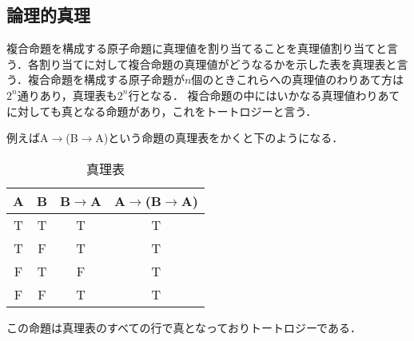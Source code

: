 \documentclass[10pt,b5paper,papersize,dvipdfmx]{jsbook}
\begin{document}
\subsection{論理的真理}
複合命題を構成する原子命題に真理値を割り当てることを真理値割り当てと言う．各割り当てに対して複合命題の真理値がどうなるかを示した表を真理表と言う．複合命題を構成する原子命題が$n$個のときこれらへの真理値のわりあて方は$2^n$通りあり，真理表も$2^n$行となる．
複合命題の中にはいかなる真理値わりあてに対しても真となる命題があり，これをトートロジーと言う．\par
例えばA$\to$(B$\to$A)という命題の真理表をかくと下のようになる．
\begin{table}[H]
\begin{center}
\caption{真理表}
\begin{tabular}{|c|c||c|c|}\hline
A&B&B$\to$A&A$\to$(B$\to$A) \\ \hline \hline
T&T&T&T \\ \hline
T&F&T&T \\ \hline
F&T&F&T \\ \hline
F&F&T&T \\ \hline
\end{tabular}
\end{center}
\end{table}
この命題は真理表のすべての行で真となっておりトートロジーである．
\end{document}
